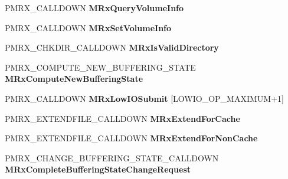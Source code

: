 \begin{DoxyCompactItemize}
P\+M\+R\+X\+\_\+\+C\+A\+L\+L\+D\+O\+WN {\bfseries M\+Rx\+Query\+Volume\+Info}
\item 
\mbox{\label{struct___m_i_n_i_r_d_r___d_i_s_p_a_t_c_h_a010d1b8c9bc1038cde7690afd1202f2e}} 
P\+M\+R\+X\+\_\+\+C\+A\+L\+L\+D\+O\+WN {\bfseries M\+Rx\+Set\+Volume\+Info}
\item 
\mbox{\label{struct___m_i_n_i_r_d_r___d_i_s_p_a_t_c_h_ad12097c9328f68624ac8de7c510771c4}} 
P\+M\+R\+X\+\_\+\+C\+H\+K\+D\+I\+R\+\_\+\+C\+A\+L\+L\+D\+O\+WN {\bfseries M\+Rx\+Is\+Valid\+Directory}
\item 
\mbox{\label{struct___m_i_n_i_r_d_r___d_i_s_p_a_t_c_h_aa2b6877f76a74e9e77c17bf85e7af45e}} 
P\+M\+R\+X\+\_\+\+C\+O\+M\+P\+U\+T\+E\+\_\+\+N\+E\+W\+\_\+\+B\+U\+F\+F\+E\+R\+I\+N\+G\+\_\+\+S\+T\+A\+TE {\bfseries M\+Rx\+Compute\+New\+Buffering\+State}
\item 
\mbox{\label{struct___m_i_n_i_r_d_r___d_i_s_p_a_t_c_h_a2dfe567e4fd537a2894c5de582f11ac3}} 
P\+M\+R\+X\+\_\+\+C\+A\+L\+L\+D\+O\+WN {\bfseries M\+Rx\+Low\+I\+O\+Submit} \mbox{[}L\+O\+W\+I\+O\+\_\+\+O\+P\+\_\+\+M\+A\+X\+I\+M\+UM+1\mbox{]}
\item 
\mbox{\label{struct___m_i_n_i_r_d_r___d_i_s_p_a_t_c_h_a318161319590aa6966d17c11686363e9}} 
P\+M\+R\+X\+\_\+\+E\+X\+T\+E\+N\+D\+F\+I\+L\+E\+\_\+\+C\+A\+L\+L\+D\+O\+WN {\bfseries M\+Rx\+Extend\+For\+Cache}
\item 
\mbox{\label{struct___m_i_n_i_r_d_r___d_i_s_p_a_t_c_h_ada001ac713e1d44f2358f3186dde37b7}} 
P\+M\+R\+X\+\_\+\+E\+X\+T\+E\+N\+D\+F\+I\+L\+E\+\_\+\+C\+A\+L\+L\+D\+O\+WN {\bfseries M\+Rx\+Extend\+For\+Non\+Cache}
\item 
\mbox{\label{struct___m_i_n_i_r_d_r___d_i_s_p_a_t_c_h_a0e534df7e7601a8031896e1aef92adea}} 
P\+M\+R\+X\+\_\+\+C\+H\+A\+N\+G\+E\+\_\+\+B\+U\+F\+F\+E\+R\+I\+N\+G\+\_\+\+S\+T\+A\+T\+E\+\_\+\+C\+A\+L\+L\+D\+O\+WN {\bfseries M\+Rx\+Complete\+Buffering\+State\+Change\+Request}
\item 
\mbox{\label{struct___m_i_n_i_r_d_r___d_i_s_p_a_t_c_h_a8e0e47b5e55b825d486f9e6eaeeccb4d}} 

\end{DoxyCompactItemize}
